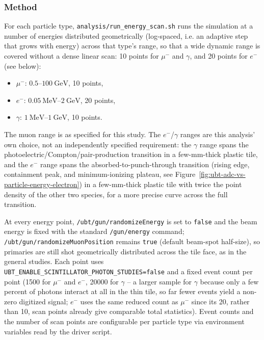 \subsubsection{Method}
For each particle type, \texttt{analysis/run\_energy\_scan.sh} runs the
simulation at a number of energies distributed geometrically (log-spaced,
i.e. an adaptive step that grows with energy) across that type's range, so
that a wide dynamic range is covered without a dense linear scan: 10 points
for $\mu^-$ and $\gamma$, and 20 points for $e^-$ (see below):
\begin{itemize}
\item $\mu^-$: $0.5$--$100~\mathrm{GeV}$, 10 points,
\item $e^-$: $0.05~\mathrm{MeV}$--$2~\mathrm{GeV}$, 20 points,
\item $\gamma$: $1~\mathrm{MeV}$--$1~\mathrm{GeV}$, 10 points.
\end{itemize}
The muon range is as specified for this study. The $e^-$/$\gamma$ ranges are
this analysis' own choice, not an independently specified requirement: the
$\gamma$ range spans the photoelectric/Compton/pair-production transition in
a few-mm-thick plastic tile, and the $e^-$ range spans the
absorbed-to-punch-through transition (rising edge, containment peak, and
minimum-ionizing plateau, see Figure~\ref{fig:ubt-adc-vs-particle-energy-electron})
in a few-mm-thick plastic tile with twice the point density of the other two
species, for a more precise curve across the full transition.

At every energy point, \texttt{/ubt/gun/randomizeEnergy} is set to
\texttt{false} and the beam energy is fixed with the standard
\texttt{/gun/energy} command; \texttt{/ubt/gun/randomizeMuonPosition}
remains \texttt{true} (default beam-spot half-size), so primaries are still
shot geometrically distributed across the tile face, as in the general
studies. Each point uses
\texttt{UBT\_ENABLE\_SCINTILLATOR\_PHOTON\_STUDIES=false} and a fixed event
count per point (1500 for $\mu^-$ and $e^-$, 20000 for $\gamma$ -- a larger
sample for $\gamma$ because only a few percent of photons interact at all in
the thin tile, so far fewer events yield a non-zero digitized signal; $e^-$
uses the same reduced count as $\mu^-$ since its 20, rather than 10, scan
points already give comparable total statistics). Event counts and the
number of scan points are configurable per particle type via environment
variables read by the driver script.

